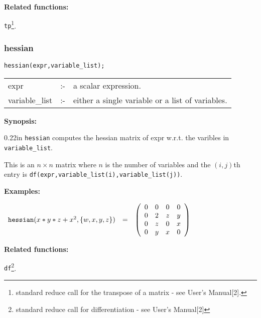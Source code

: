 {\bf Related functions:}

\hspace*{0.175in} {\tt tp}\footnote{standard reduce call for the 
transpose of a matrix - see {\REDUCE} User's Manual[2].}.


\subsubsection{hessian}
\label{linalg:hessian}

\hspace*{0.175in} {\tt hessian(expr,variable\_list);}

\hspace*{0.1in} 
\begin{tabular}{l l l}
expr           &:-& a scalar expression. \\
variable\_list &:-& either a single variable or a list of variables.
\end{tabular}

{\bf Synopsis:} %

\begin{addtolength}{\leftskip}{0.22in}
                {\tt hessian} computes the hessian matrix of expr w.r.t.
                the varibles in \texttt{variable\_list}. 

This is an $n\times n$ matrix where $n$ is the number of variables and the
$(i,j)$th entry is \texttt{df(expr,variable\_list(i),variable\_list(j))}.

\end{addtolength}

{\bf Examples:}

\begin{flushleft}  
\hspace*{0.1in}
\begin{math}        
\begin{array}{ccc}
{\tt hessian}(x*y*z+x^2,\{w,x,y,z\}) & = & 
\left( \begin{array}{cccc} 0 & 0 & 0 & 0 \\ 0 & 2 & z & y \\ 0 & z & 0 
& x \\ 0 & y & x & 0
\end{array} \right)
\end{array}
\end{math}  
\end{flushleft}


{\bf Related functions:}

\hspace*{0.175in} {\tt df}\footnote{standard reduce call for 
differentiation - see {\REDUCE} User's Manual[2]}.


